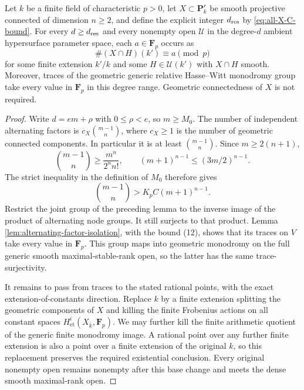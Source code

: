 \begin{theorem}\label{thm:all-X-residue-density}
Let $k$ be a finite field of characteristic $p>0$, let
$X\subset\mathbf P^r_k$ be smooth projective connected of
dimension $n\geq2$, and define the explicit integer
$d_{\rm res}$ by \eqref{eq:all-X-C-bound}.
For every $d\geq d_{\rm res}$ and every nonempty open
$\mathcal U$ in the degree-$d$ ambient hypersurface
parameter space, each $a\in\mathbf F_p$ occurs as
\[
 \#(X\cap H)(k')\equiv a\pmod p
\]
for some finite extension $k'/k$ and some
$H\in\mathcal U(k')$ with $X\cap H$ smooth.
Moreover, traces of the geometric generic relative
Hasse--Witt monodromy group take every value in
$\mathbf F_p$ in this degree range.
Geometric connectedness of $X$ is not required.
\end{theorem}

\begin{proof}
Write $d=em+\rho$ with $0\leq\rho<e$, so $m\geq M_0$.
The number of independent alternating factors is
$c_X\binom{m-1}{n}$, where $c_X\geq1$ is the number of
geometric connected components.  In particular it is
at least $\binom{m-1}{n}$.
Since $m\geq2(n+1)$,
\[
 \binom{m-1}{n}\geq\frac{m^n}{2^n n!},
 \qquad
 (m+1)^{n-1}\leq(3m/2)^{n-1}.
 \]
The strict inequality in the definition of $M_0$ therefore
gives
\[
 \binom{m-1}{n}>K_pC(m+1)^{n-1}.
 \tag{17}
\]
Restrict the joint group of the preceding lemma to the
inverse image of the product of alternating node groups.
It still surjects to that product.  Lemma
\ref{lem:alternating-factor-isolation}, with the bound (12),
shows that its traces on $V$ take every value in
$\mathbf F_p$.  This group maps into geometric monodromy
on the full generic smooth maximal-stable-rank open, so
the latter has the same trace-surjectivity.

It remains to pass from traces to the stated rational
points, with the exact extension-of-constants direction.
Replace $k$ by a finite extension splitting the geometric
components of $X$ and killing the finite Frobenius actions
on all constant spaces
$H^i_{\mathrm{et}}(X_{\bar k},\mathbf F_p)$.
We may further kill the finite arithmetic quotient of
the generic finite monodromy image.  A rational point
over any further finite extension is also a point over a
finite extension of the original $k$, so this replacement
preserves the required existential conclusion.
Every original nonempty open remains nonempty after this
base change and meets the dense smooth maximal-rank open.


\end{proof}
